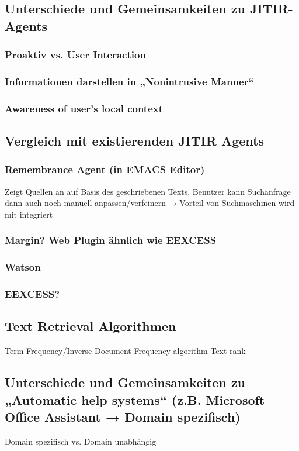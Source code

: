 \subsection{Unterschiede und Gemeinsamkeiten zu JITIR-Agents}
 \subsubsection{Proaktiv vs. User Interaction}
 \subsubsection{Informationen darstellen in „Nonintrusive Manner“}
 \subsubsection{Awareness of user's local context}
\subsection{Vergleich mit existierenden JITIR Agents}
 	\subsubsection{Remembrance Agent (in EMACS Editor)}
		Zeigt Quellen an auf Basis des geschriebenen Texts, Benutzer kann Suchanfrage dann auch noch manuell anpassen/verfeinern
		→ Vorteil von Suchmaschinen wird mit integriert
 	\subsubsection{Margin? Web Plugin ähnlich wie EEXCESS}
 	\subsubsection{Watson}
 	\subsubsection{EEXCESS?}
 	\subsection{Text Retrieval Algorithmen}
 		Term Frequency/Inverse Document Frequency algorithm
 		Text rank
 \subsection{Unterschiede und Gemeinsamkeiten zu „Automatic help systems“ (z.B. Microsoft Office Assistant → Domain spezifisch)}
 	Domain spezifisch vs. Domain unabhängig

